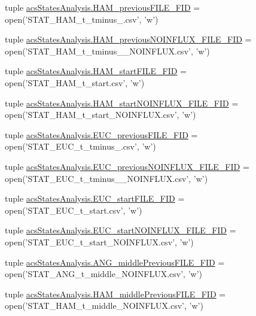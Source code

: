 \begin{DoxyCompactItemize}
\item 
tuple \hyperlink{a00130_a3aad86d2cdbfb6f36b4b563b190d76c9}{acs\-States\-Analysis.\-H\-A\-M\-\_\-previous\-F\-I\-L\-E\-\_\-\-F\-I\-D} = open('S\-T\-A\-T\-\_\-\-H\-A\-M\-\_\-t\-\_\-tminus\-\_.\-csv', 'w')
\item 
tuple \hyperlink{a00130_a621d86851e86f9c83bb0add9ec741d7f}{acs\-States\-Analysis.\-H\-A\-M\-\_\-previous\-N\-O\-I\-N\-F\-L\-U\-X\-\_\-\-F\-I\-L\-E\-\_\-\-F\-I\-D} = open('S\-T\-A\-T\-\_\-\-H\-A\-M\-\_\-t\-\_\-tminus\-\_\-\_\-\-N\-O\-I\-N\-F\-L\-U\-X.\-csv', 'w')
\item 
tuple \hyperlink{a00130_abb14887e587e1107fc13046ad313077e}{acs\-States\-Analysis.\-H\-A\-M\-\_\-start\-F\-I\-L\-E\-\_\-\-F\-I\-D} = open('S\-T\-A\-T\-\_\-\-H\-A\-M\-\_\-t\-\_\-start.\-csv', 'w')
\item 
tuple \hyperlink{a00130_ab8a3b402c0b418cc290889a5f6482280}{acs\-States\-Analysis.\-H\-A\-M\-\_\-start\-N\-O\-I\-N\-F\-L\-U\-X\-\_\-\-F\-I\-L\-E\-\_\-\-F\-I\-D} = open('S\-T\-A\-T\-\_\-\-H\-A\-M\-\_\-t\-\_\-start\-\_\-\-N\-O\-I\-N\-F\-L\-U\-X.\-csv', 'w')
\item 
tuple \hyperlink{a00130_a3548edac9afffda077dcbd2876616b39}{acs\-States\-Analysis.\-E\-U\-C\-\_\-previous\-F\-I\-L\-E\-\_\-\-F\-I\-D} = open('S\-T\-A\-T\-\_\-\-E\-U\-C\-\_\-t\-\_\-tminus\-\_.\-csv', 'w')
\item 
tuple \hyperlink{a00130_aa2efc59329473a7bbeaf3ce32ec4dc3d}{acs\-States\-Analysis.\-E\-U\-C\-\_\-previous\-N\-O\-I\-N\-F\-L\-U\-X\-\_\-\-F\-I\-L\-E\-\_\-\-F\-I\-D} = open('S\-T\-A\-T\-\_\-\-E\-U\-C\-\_\-t\-\_\-tminus\-\_\-\_\-\-N\-O\-I\-N\-F\-L\-U\-X.\-csv', 'w')
\item 
tuple \hyperlink{a00130_a3d812ff298612e6aae54e7a9abfddbf2}{acs\-States\-Analysis.\-E\-U\-C\-\_\-start\-F\-I\-L\-E\-\_\-\-F\-I\-D} = open('S\-T\-A\-T\-\_\-\-E\-U\-C\-\_\-t\-\_\-start.\-csv', 'w')
\item 
tuple \hyperlink{a00130_a8ae5873fd9b162495a512e314047e930}{acs\-States\-Analysis.\-E\-U\-C\-\_\-start\-N\-O\-I\-N\-F\-L\-U\-X\-\_\-\-F\-I\-L\-E\-\_\-\-F\-I\-D} = open('S\-T\-A\-T\-\_\-\-E\-U\-C\-\_\-t\-\_\-start\-\_\-\-N\-O\-I\-N\-F\-L\-U\-X.\-csv', 'w')
\item 
tuple \hyperlink{a00130_aa5eb16eef2c90e2ccc991eb176280f21}{acs\-States\-Analysis.\-A\-N\-G\-\_\-middle\-Previous\-F\-I\-L\-E\-\_\-\-F\-I\-D} = open('S\-T\-A\-T\-\_\-\-A\-N\-G\-\_\-t\-\_\-middle\-\_\-\-N\-O\-I\-N\-F\-L\-U\-X.\-csv', 'w')
\item 
tuple \hyperlink{a00130_aaf0dd6e74d88a7cf2e909301b422c17d}{acs\-States\-Analysis.\-H\-A\-M\-\_\-middle\-Previous\-F\-I\-L\-E\-\_\-\-F\-I\-D} = open('S\-T\-A\-T\-\_\-\-H\-A\-M\-\_\-t\-\_\-middle\-\_\-\-N\-O\-I\-N\-F\-L\-U\-X.\-csv', 'w')

\end{DoxyCompactItemize}
